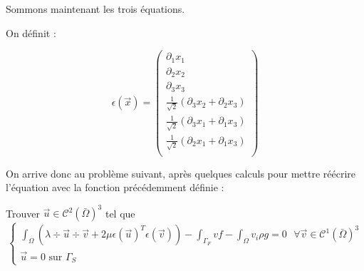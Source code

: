 Sommons maintenant les trois équations.



On définit :

$$
\epsilon(\vec{x})=
\begin{pmatrix}
    \partial_1 x_1\\
    \partial_2 x_2\\ 
    \partial_3 x_3\\
    \frac{1}{\sqrt{2}}(\partial_3 x_2 + \partial_2 x_3)\\
    \frac{1}{\sqrt{2}}(\partial_3 x_1 + \partial_1 x_3)\\
    \frac{1}{\sqrt{2}}(\partial_2 x_1 + \partial_1 x_3)\\
\end{pmatrix}
$$

On arrive donc au problème suivant, après quelques calculs pour mettre réécrire l'équation avec la fonction précédemment définie :

Trouver $\vec{u} \in \mathcal{C}^2(\bar{\Omega})^3$ tel que
\begin{equation}
    \begin{cases}
        \displaystyle\int_{\Omega} (\lambda \div \vec{u} \div \vec{v} + 2\mu \epsilon(\vec{u})^T \epsilon(\vec{v})) - \int_{\Gamma_F} v f - \int_\Omega v_i \rho g = 0 \textrm{ } \forall \vec{v} \in \mathcal{C}^1(\bar{\Omega})^3\\
        \vec{u} = 0 \textrm{ sur } \Gamma_S
    \end{cases}
\end{equation}
